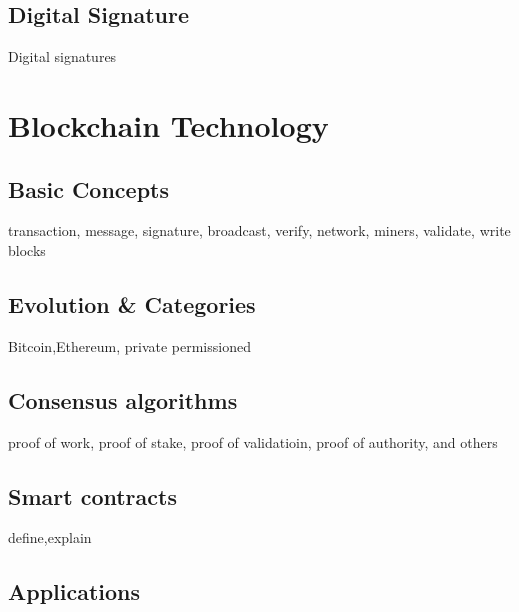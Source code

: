 
\subsection{Digital Signature}
Digital signatures 


\section{Blockchain Technology}
\subsection{Basic Concepts}
transaction, message, signature, broadcast, verify, network, miners, validate, write blocks 

\subsection{Evolution \& Categories}
Bitcoin,Ethereum, private permissioned
\subsection{Consensus algorithms}
proof of work, proof of stake, proof of validatioin, proof of authority, and others


\subsection{Smart contracts}
define,explain
\subsection{Applications}





